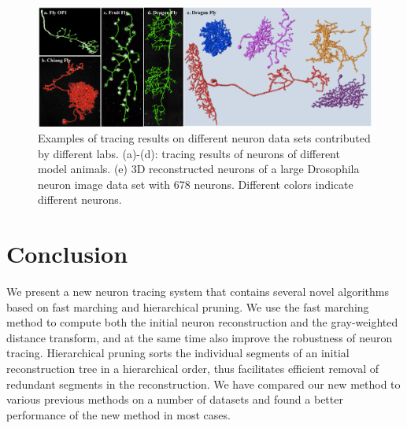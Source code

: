 \begin{figure}[htbp]
\centering
\includegraphics[width=1.0\textwidth]{images/autont_fig4}
\caption[Examples of tracing results on different neuron data sets contributed by different labs]{Examples of tracing results on different neuron data sets contributed by different labs. (a)-(d): tracing results of neurons of different model animals. (e) 3D reconstructed neurons of a large Drosophila neuron image data set with 678 neurons. Different colors indicate different neurons.}
\label{fig:autont-fig4}
\end{figure}

\section{Conclusion}
We present a new neuron tracing system that contains several novel algorithms based on fast marching and hierarchical pruning. We use the fast marching method to compute both the initial neuron reconstruction and the gray-weighted distance transform, and at the same time also improve the robustness of neuron tracing. Hierarchical pruning sorts the individual segments of an initial reconstruction tree in a hierarchical order, thus facilitates efficient removal of redundant segments in the reconstruction. We have compared our new method to various previous methods on a number of datasets and found a better performance of the new method in most cases. 
